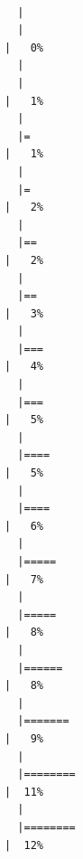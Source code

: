 \documentclass[
  letterpaper,
  DIV=11,
  numbers=noendperiod]{scrreprt}
\begin{document}
\begin{verbatim}

  |                                                                            
  |                                                                      |   0%
  |                                                                            
  |                                                                      |   1%
  |                                                                            
  |=                                                                     |   1%
  |                                                                            
  |=                                                                     |   2%
  |                                                                            
  |==                                                                    |   2%
  |                                                                            
  |==                                                                    |   3%
  |                                                                            
  |===                                                                   |   4%
  |                                                                            
  |===                                                                   |   5%
  |                                                                            
  |====                                                                  |   5%
  |                                                                            
  |====                                                                  |   6%
  |                                                                            
  |=====                                                                 |   7%
  |                                                                            
  |=====                                                                 |   8%
  |                                                                            
  |======                                                                |   8%
  |                                                                            
  |=======                                                               |   9%
  |                                                                            
  |========                                                              |  11%
  |                                                                            
  |========                                                              |  12%

\end{verbatim}
\end{document}
